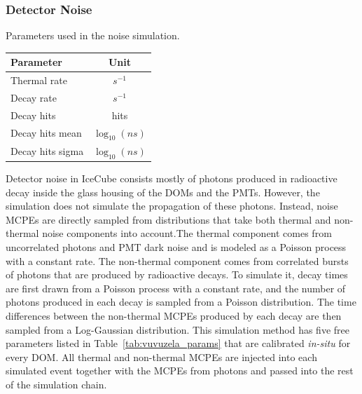 \subsubsection{Detector Noise}

\begin{margintable}
\caption{\label{tab:vuvuzela_params} Parameters used in the noise simulation. }
    \begin{tabular}{lc}\toprule
        \textbf{Parameter} & \textbf{Unit} \\ \midrule
        Thermal rate &  $s^{-1}$ \\ 
        Decay rate &  $s^{-1}$ \\
        Decay hits &  hits \\ 
        Decay hits mean &  $\log_{10} (ns) $\\ 
        Decay hits sigma &  $\log_{10} (ns) $ \\ \bottomrule
    \end{tabular}
\end{margintable}
Detector noise in IceCube consists mostly of photons produced in radioactive decay inside the glass housing of the DOMs and the PMTs. However, the simulation does not simulate the propagation of these photons. Instead, noise MCPEs are directly sampled from distributions that take both thermal and non-thermal noise components into account.The thermal component comes from uncorrelated photons and PMT dark noise and is modeled as a Poisson process with a constant rate. The non-thermal component comes from correlated bursts of photons that are produced by radioactive decays. To simulate it, decay times are first drawn from a Poisson process with a constant rate, and the number of photons produced in each decay is sampled from a Poisson distribution. The time differences between the non-thermal MCPEs produced by each decay are then sampled from a Log-Gaussian distribution. This simulation method has five free parameters listed in Table~\ref{tab:vuvuzela_params} that are calibrated \emph{in-situ} for every DOM. All thermal and non-thermal MCPEs are injected into each simulated event together with the MCPEs from photons and passed into the rest of the simulation chain.


